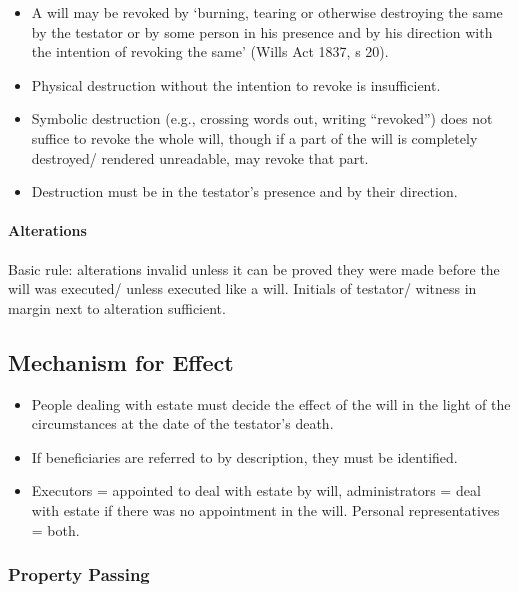 \documentclass[
]{article}
\providecommand{\tightlist}{%
  \setlength{\itemsep}{0pt}\setlength{\parskip}{0pt}}
\begin{document}
\begin{enumerate}
  \begin{itemize}
  \tightlist
  \item
    A will may be revoked by `burning, tearing or otherwise destroying
    the same by the testator or by some person in his presence and by
    his direction with the intention of revoking the same' (Wills Act
    1837, s 20).
  \item
    Physical destruction without the intention to revoke is
    insufficient.
  \item
    Symbolic destruction (e.g., crossing words out, writing ``revoked'')
    does not suffice to revoke the whole will, though if a part of the
    will is completely destroyed/ rendered unreadable, may revoke that
    part.
  \item
    Destruction must be in the testator's presence and by their
    direction.
  \end{itemize}
\end{enumerate}

\hypertarget{alterations}{%
\paragraph{Alterations}\label{alterations}}

Basic rule: alterations invalid unless it can be proved they were made
before the will was executed/ unless executed like a will. Initials of
testator/ witness in margin next to alteration sufficient.

\hypertarget{mechanism-for-effect}{%
\subsection{Mechanism for Effect}\label{mechanism-for-effect}}

\begin{itemize}
\tightlist
\item
  People dealing with estate must decide the effect of the will in the
  light of the circumstances at the date of the testator's death.
\item
  If beneficiaries are referred to by description, they must be
  identified.
\item
  Executors = appointed to deal with estate by will, administrators =
  deal with estate if there was no appointment in the will. Personal
  representatives = both.
\end{itemize}

\hypertarget{property-passing}{%
\subsubsection{Property Passing}\label{property-passing}}
\end{document}
